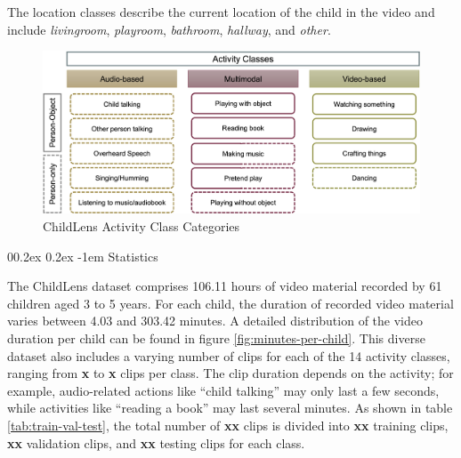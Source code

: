 \documentclass[
  man,floatsintext]{apa6}
\makeatletter
\let\oldparagraph\paragraph
\renewcommand{\paragraph}{
    \@ifstar
      \xxxParagraphStar
      \xxxParagraphNoStar
  }
\newcommand{\xxxParagraphStar}[1]{\oldparagraph*{#1}\mbox{}}
\newcommand{\xxxParagraphNoStar}[1]{\oldparagraph{#1}\mbox{}}
\renewcommand{\paragraph}{\@startsection{paragraph}{4}{\parindent}%
  {0\baselineskip \@plus 0.2ex \@minus 0.2ex}%
  {-1em}%
  {\normalfont\normalsize\bfseries\itshape\typesectitle}}
\makeatother
\begin{document}
The location classes describe the current location of the child in the video and include \emph{livingroom}, \emph{playroom}, \emph{bathroom}, \emph{hallway}, and \emph{other}.

\begin{figure}

{\centering \includegraphics[width=5.95in]{activity_classes} 

}

\caption{ChildLens Activity Class Categories}\label{fig:activity-classes}
\end{figure}

\paragraph{Statistics}\label{statistics}

The ChildLens dataset comprises 106.11 hours of video material recorded by 61 children aged 3 to 5 years. For each child, the duration of recorded video material varies between 4.03 and 303.42 minutes. A detailed distribution of the video duration per child can be found in figure \ref{fig:minutes-per-child}. This diverse dataset also includes a varying number of clips for each of the 14 activity classes, ranging from \textbf{x} to \textbf{x} clips per class. The clip duration depends on the activity; for example, audio-related actions like ``child talking'' may only last a few seconds, while activities like ``reading a book'' may last several minutes. As shown in table \ref{tab:train-val-test}, the total number of \textbf{xx} clips is divided into \textbf{xx} training clips, \textbf{xx} validation clips, and \textbf{xx} testing clips for each class.
\end{document}
